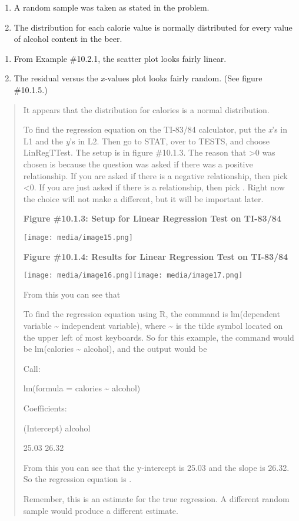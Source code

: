 \documentclass[]{book}
\begin{document}
\begin{enumerate}
\def\labelenumi{\alph{enumi}.}
\item
  A random sample was taken as stated in the problem.
\item
  The distribution for each calorie value is normally distributed for every value of alcohol content in the beer.
\end{enumerate}

\begin{enumerate}
\def\labelenumi{\roman{enumi}.}
\item
  From Example \#10.2.1, the scatter plot looks fairly linear.
\item
  The residual versus the \emph{x-}values plot looks fairly random. (See figure \#10.1.5.)
\end{enumerate}

\begin{quote}
It appears that the distribution for calories is a normal distribution.

To find the regression equation on the TI-83/84 calculator, put the \emph{x}'s in L1 and the \emph{y}'s in L2. Then go to STAT, over to TESTS, and choose LinRegTTest. The setup is in figure \#10.1.3. The reason that \textgreater{}0 was chosen is because the question was asked if there was a positive relationship. If you are asked if there is a negative relationship, then pick \textless{}0. If you are just asked if there is a relationship, then pick . Right now the choice will not make a different, but it will be important later.

\textbf{Figure \#10.1.3: Setup for Linear Regression Test on TI-83/84}

\texttt{[image: media/image15.png]}

\textbf{Figure \#10.1.4: Results for Linear Regression Test on TI-83/84}

\texttt{[image: media/image16.png]}\texttt{[image: media/image17.png]}

From this you can see that

To find the regression equation using R, the command is lm(dependent variable \textasciitilde{} independent variable), where \textasciitilde{} is the tilde symbol located on the upper left of most keyboards. So for this example, the command would be lm(calories \textasciitilde{} alcohol), and the output would be

Call:

lm(formula = calories \textasciitilde{} alcohol)

Coefficients:

(Intercept) alcohol

25.03 26.32

From this you can see that the y-intercept is 25.03 and the slope is 26.32. So the regression equation is .

Remember, this is an estimate for the true regression. A different random sample would produce a different estimate.
\end{quote}
\end{document}
